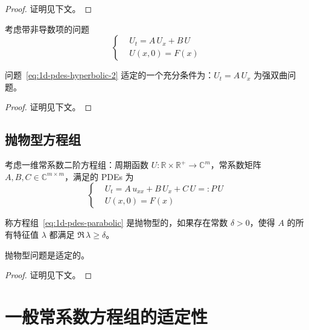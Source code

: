 \begin{proof}
    证明见下文。
\end{proof}

考虑带非导数项的问题
\begin{equation}
    \left\{
    \begin{aligned}
         & U_t = A\,U_x  + B\,U \\
         & U(x,0) = F(x)
    \end{aligned}
    \right.
    \label{eq:1d-pdes-hyperbolic-2}
\end{equation}

\begin{theorem}\label{thm:well-posed-3}
    问题~\eqref{eq:1d-pdes-hyperbolic-2} 适定的一个充分条件为：$U_t = A\,U_x$ 为强双曲问题。
\end{theorem}

\begin{proof}
    证明见下文。
\end{proof}

\subsection{抛物型方程组}


考虑一维常系数二阶方程组：周期函数 $U: \mathbb{R} \times \mathbb{R}^+ \to \mathbb{C}^{m}$，常系数矩阵 $A,B,C \in \mathbb{C}^{m \times m}$，满足的 PDEs 为
\begin{equation}
    \left\{
    \begin{aligned}
         & U_t = A\,u_{xx} + B\,U_x + C\,U =: P\,U \\
         & U(x,0) = F(x)
    \end{aligned}
    \right.
    \label{eq:1d-pdes-parabolic}
\end{equation}

\begin{definition}
    称方程组~\eqref{eq:1d-pdes-parabolic} 是抛物型的，如果存在常数 $\delta > 0$，使得 $A$ 的所有特征值 $\lambda$ 都满足 $\Re\, \lambda \ge \delta$。
\end{definition}


\begin{theorem}\label{thm:well-posed-4}
    抛物型问题是适定的。
\end{theorem}

\begin{proof}
    证明见下文。
\end{proof}

\section{一般常系数方程组的适定性}

